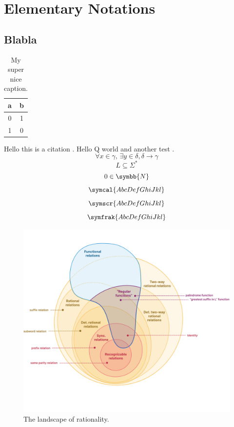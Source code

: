 \documentclass[a4paper,sfsidenotes,twoside,justified,nobib]{tufte-book-custom}
\begin{document}
\section{Elementary Notations}

\subsection{Blabla}


\begin{table}
	\centering
	\begin{tabular}{cc}
		\toprule
		a & b \\ \midrule
		0 & 1 \\
		1 & 0 \\ \bottomrule
	\end{tabular}
	\caption{My super nice caption.}
\end{table}

\citereset
Hello this is a citation \cite{Bringhurst2005}.
Hello Q world and another test \cite{Bringhurst2005}.
\[\forall x \in \gamma,\, \exists y\in \delta, \delta \to \gamma\]
\[L \subseteq \Sigma^*\]
\[0 \in \symbb{N}\]
\[\symcal{AbcDefGhiJkl}\]
\[\symscr{AbcDefGhiJkl}\]
\[\symfrak{AbcDefGhiJkl}\]

\lipsum[1-2]

\begin{figure}[htb]
	\centering
	\includegraphics[width=\linewidth]{fig/landscape.png}
	\caption{The landscape of rationality.}
\end{figure}
\end{document}
